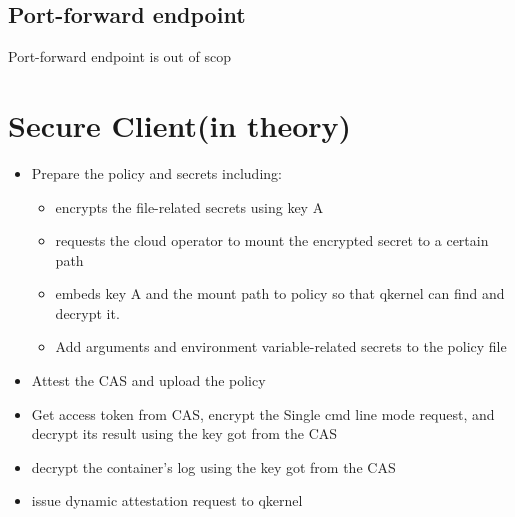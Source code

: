 \subsection{Port-forward endpoint}
Port-forward endpoint is out of scop

\section{Secure Client(in theory)}

\begin{itemize}
    \item  Prepare the policy and secrets including:
    \begin{itemize}
        \item  encrypts the file-related secrets using key A
        \item requests the cloud operator to mount the encrypted secret to a certain path
        \item embeds key A  and the mount path to policy so that qkernel can find and decrypt it.
        \item  Add arguments and environment variable-related secrets to the policy file
    \end{itemize}
    \item Attest the CAS and upload the policy
    \item  Get access token from CAS, encrypt the Single cmd line mode request, and decrypt its result using the key got from the CAS
    \item  decrypt the container's log using the key got from the CAS
    \item  issue dynamic attestation request to qkernel
\end{itemize}






\cleardoublepage

